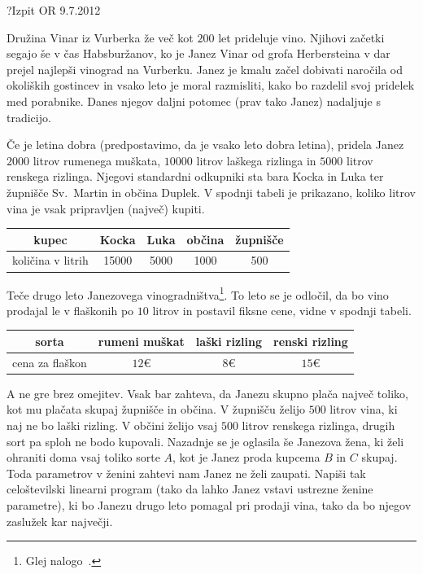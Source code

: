\begin{naloga}{?}{Izpit OR 9.7.2012}
\begin{vprasanje}
Družina Vinar iz Vurberka že več kot $200$ let prideluje vino.
Njihovi začetki segajo še v čas Habsburžanov,
ko je Janez Vinar od grofa Herbersteina
v dar prejel najlepši vinograd na Vurberku.
Janez je kmalu začel dobivati naročila od okoliških gostincev
in vsako leto je moral razmisliti,
kako bo razdelil svoj pridelek med porabnike.
Danes njegov daljni potomec (prav tako Janez) nadaljuje s tradicijo.

Če je letina dobra (predpostavimo, da je vsako leto dobra letina),
pridela Janez $2000$ litrov rumenega muškata,
$10000$ litrov laškega rizlinga in $5000$ litrov renskega rizlinga.
Njegovi standardni odkupniki sta bara Kocka in Luka
ter župnišče Sv.~Martin in občina Duplek.
V spodnji tabeli je prikazano,
koliko litrov vina je vsak pripravljen (največ) kupiti.
\begin{center}
\begin{tabular}{c|cccc}
kupec & Kocka & Luka & občina & župnišče \\ \hline
količina v litrih & 15000 & 5000 & 1000 & 500
\end{tabular}
\end{center}
Teče drugo leto Janezovega vinogradništva\footnote{
Glej nalogo~.
}.
To leto se je odločil,
da bo vino prodajal le v flaškonih po $10$ litrov
in postavil fiksne cene, vidne v spodnji tabeli.
\begin{center}
\begin{tabular}{c|ccc}
sorta & rumeni muškat & laški rizling & renski rizling \\ \hline
cena za flaškon & $12 €$ & $8 €$ & $15 €$
\end{tabular}
\end{center}
A ne gre brez omejitev.
Vsak bar zahteva, da Janezu skupno plača največ toliko,
kot mu plačata skupaj župnišče in občina.
V župnišču želijo $500$ litrov vina, ki naj ne bo laški rizling.
V občini želijo vsaj $500$ litrov renskega rizlinga,
drugih sort pa sploh ne bodo kupovali.
Nazadnje se je oglasila še Janezova žena,
ki želi ohraniti doma vsaj toliko sorte $A$,
kot je Janez proda kupcema $B$ in $C$ skupaj.
Toda parametrov v ženini zahtevi nam Janez ne želi zaupati.
Napiši tak celoštevilski linearni program
(tako da lahko Janez vstavi ustrezne ženine parametre),
ki bo Janezu drugo leto pomagal pri prodaji vina,
tako da bo njegov zaslužek kar največji.
\end{vprasanje}
\begin{odgovor}
\end{odgovor}
\end{naloga}


